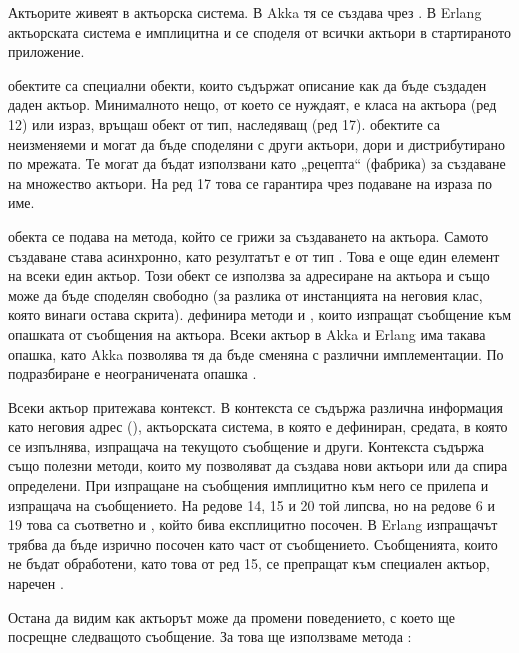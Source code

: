 Актьорите живеят в актьорска система. В Akka тя се създава чрез . В Erlang актьорската система е имплицитна и се споделя от всички актьори в стартираното приложение.

 обектите са специални обекти, които съдържат описание как да бъде създаден даден актьор. Минималното нещо, от което се нуждаят, е класа на актьора (ред 12) или израз, връщаш обект от тип, наследяващ  (ред 17).  обектите са неизменяеми и могат да бъде споделяни с други актьори, дори и дистрибутирано по мрежата. Те могат да бъдат използвани като „рецепта“ (фабрика) за създаване на множество актьори. На ред 17 това се гарантира чрез подаване на израза по име.

 обекта се подава на  метода, който се грижи за създаването на актьора. Самото създаване става асинхронно, като резултатът е от тип . Това е още един елемент на всеки един актьор. Този обект се използва за адресиране на актьора и също може да бъде споделян свободно (за разлика от инстанцията на неговия клас, която винаги остава скрита).  дефинира методи \code{!} и , които изпращат съобщение към опашката от съобщения на актьора. Всеки актьор в Akka и Erlang има такава опашка, като Akka позволява тя да бъде сменяна с различни имплементации. По подразбиране е неограничената опашка .

Всеки актьор притежава контекст. В контекста се съдържа различна информация като неговия адрес (), актьорската система, в която е дефиниран, средата, в която се изпълнява, изпращача на текущото съобщение и други. Контекста съдържа също полезни методи, които му позволяват да създава нови актьори или да спира определени. При изпращане на съобщения имплицитно към него се прилепа и изпращача на съобщението. На редове 14, 15 и 20 той липсва, но на редове 6 и 19 това са съответно  и , който бива експлицитно посочен. В Erlang изпращачът трябва да бъде изрично посочен като част от съобщението. Съобщенията, които не бъдат обработени, като това от ред 15, се препращат към специален актьор, наречен .

Остана да видим как актьорът може да промени поведението, с което ще посрещне следващото съобщение. За това ще използваме метода :

